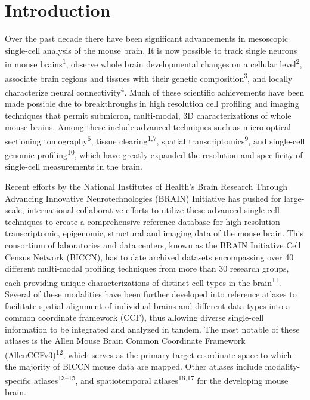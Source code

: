 \documentclass[
  12pt,
]{article}
\begin{document}
\clearpage

\section{Introduction}\label{introduction}

Over the past decade there have been significant advancements in
mesoscopic single-cell analysis of the mouse brain. It is now possible
to track single neurons in mouse brains\textsuperscript{1}, observe
whole brain developmental changes on a cellular
level\textsuperscript{2}, associate brain regions and tissues with their
genetic composition\textsuperscript{3}, and locally characterize neural
connectivity\textsuperscript{4}. Much of these scientific achievements
have been made possible due to breakthroughs in high resolution cell
profiling and imaging techniques that permit submicron, multi-modal, 3D
characterizations of whole mouse brains. Among these include advanced
techniques such as micro-optical sectioning
tomography\textsuperscript{6}, tissue clearing\textsuperscript{1,7},
spatial transcriptomics\textsuperscript{9}, and single-cell genomic
profiling\textsuperscript{10}, which have greatly expanded the
resolution and specificity of single-cell measurements in the brain.

Recent efforts by the National Institutes of Health's Brain Research
Through Advancing Innovative Neurotechnologies (BRAIN) Initiative has
pushed for large-scale, international collaborative efforts to utilize
these advanced single cell techniques to create a comprehensive
reference database for high-resolution transcriptomic, epigenomic,
structural and imaging data of the mouse brain. This consortium of
laboratories and data centers, known as the BRAIN Initiative Cell Census
Network (BICCN), has to date archived datasets encompassing over 40
different multi-modal profiling techniques from more than 30 research
groups, each providing unique characterizations of distinct cell types
in the brain\textsuperscript{11}. Several of these modalities have been
further developed into reference atlases to facilitate spatial alignment
of individual brains and different data types into a common coordinate
framework (CCF), thus allowing diverse single-cell information to be
integrated and analyzed in tandem. The most notable of these atlases is
the Allen Mouse Brain Common Coordinate Framework
(AllenCCFv3)\textsuperscript{12}, which serves as the primary target
coordinate space to which the majority of BICCN mouse data are mapped.
Other atlases include modality-specific atlases\textsuperscript{13--15},
and spatiotemporal atlases\textsuperscript{16,17} for the developing
mouse brain.
\end{document}
